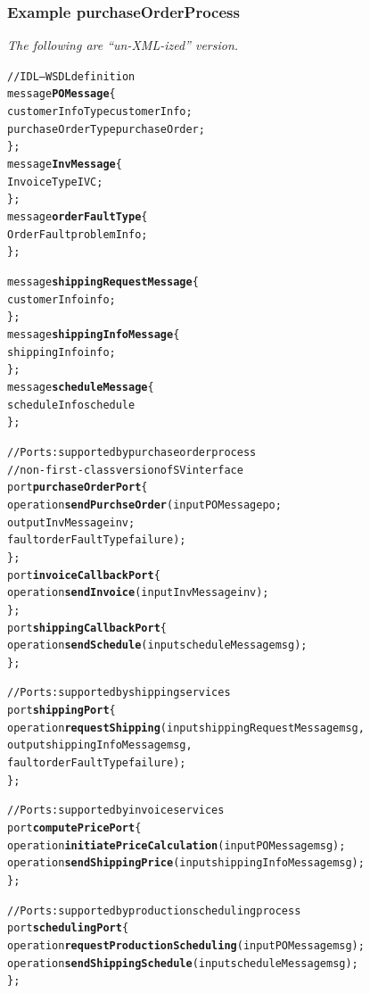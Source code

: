 \documentclass{note}
\begin{document}
\subsubsection{Example purchaseOrderProcess}
\textcolor{red2}{\em The following are ``un-XML-ized'' version.}

\begin{alltt}
   // IDL -- WSDL definition
   message \textbf{POMessage} \{
     customerInfoType customerInfo;
     purchaseOrderType purchaseOrder;
   \};
   message \textbf{InvMessage} \{
     InvoiceType IVC;
   \};
   message \textbf{orderFaultType} \{
     OrderFault problemInfo;
   \};

   message \textbf{shippingRequestMessage} \{
     customerInfo info;
   \};
   message \textbf{shippingInfoMessage} \{
     shippingInfo info;
   \};
   message \textbf{scheduleMessage} \{
     scheduleInfo schedule
   \};
\end{alltt}

\begin{alltt}
  // Ports: supported by purchase order process
  // non-first-class version of SV interface
  port \textbf{purchaseOrderPort} \{
    operation \textbf{sendPurchseOrder}(input POMessage po;
                               output InvMessage inv;
                               fault orderFaultType failure);
  \};
  port \textbf{invoiceCallbackPort} \{
    operation \textbf{sendInvoice}(input InvMessage inv);
  \};
  port \textbf{shippingCallbackPort} \{
    operation \textbf{sendSchedule}(input scheduleMessage msg);
  \};  
\end{alltt}

\begin{alltt}
  // Ports: supported by shipping services
  port \textbf{shippingPort} \{
    operation \textbf{requestShipping}(input shippingRequestMessage msg,
                              output shippingInfoMessage msg,
                              fault orderFaultType failure);
  \};
\end{alltt}

\begin{alltt}
  // Ports: supported by invoice services
  port \textbf{computePricePort} \{
    operation \textbf{initiatePriceCalculation}(input POMessage msg);
    operation \textbf{sendShippingPrice}(input shippingInfoMessage msg);
  \};
\end{alltt}

\begin{alltt}
  // Ports: supported by production scheduling process
  port \textbf{schedulingPort} \{
    operation \textbf{requestProductionScheduling}(input POMessage msg);
    operation \textbf{sendShippingSchedule}(input scheduleMessage msg);
  \};
\end{alltt}
\end{document}
